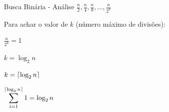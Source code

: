 \documentclass{beamer}
\DeclarePairedDelimiter{\ceil}{\lceil}{\rceil}
\begin{document}
	\begin{frame}{Busca Binária - Análise}
		\center $\displaystyle \frac{n}{2},\frac{n}{4},\frac{n}{8},\ldots,\frac{n}{2^k}$

		Para achar o valor de $k$ (número máximo de divisões):

		\center $\displaystyle \frac{n}{2^k} = 1$
		
		\center $\displaystyle k = \log_2{n}$
		
		\center $\displaystyle k = \ceil{\log_2{n}}$

		\center $\displaystyle \sum_{i=1}^{\ceil{\log_2{n}}}{1} = \log_2{n}$
	\end{frame}





\end{document}
